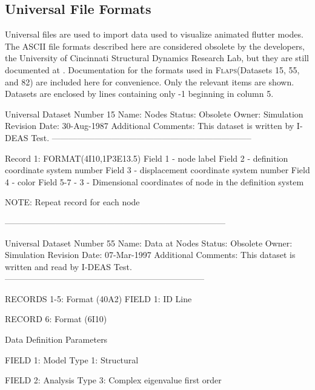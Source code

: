 \documentclass[10pt,openany,twoside]{book}
\numberwithin{equation}{section}   %
\newcommand{\Flaps}{{\normalfont\scshape Flaps\:}}
\begin{document}
\subsection{Universal File Formats}\label{sect:universal-file}
Universal files are used to import data used to visualize animated
flutter modes.
The ASCII file formats described here are considered obsolete by the
developers, the University of Cincinnati Structural Dynamics Research Lab,
but they are still documented at \cite{UniversalFile}. Documentation for
the formats used in \Flaps (Datasets 15, 55, and 82) are included here
for convenience. Only the relevant items are shown. Datasets are enclosed
by lines containing only -1 beginning in column 5.
\par
\begin{example}

Universal Dataset Number 15
Name:   Nodes
Status: Obsolete
Owner:  Simulation
Revision Date: 30-Aug-1987
Additional Comments: This dataset is written by I-DEAS Test.
-----------------------------------------------------------------------

             Record 1: FORMAT(4I10,1P3E13.5)
                       Field 1 -    node label
                       Field 2 -    definition coordinate system number
                       Field 3 -    displacement coordinate system number
                       Field 4 -    color
                       Field 5-7 -  3 - Dimensional coordinates of node
                                    in the definition system

             NOTE:  Repeat record for each node

------------------------------------------------------------------------------

Universal Dataset Number 55
Name:   Data at Nodes
Status: Obsolete
Owner:  Simulation
Revision Date: 07-Mar-1997
Additional Comments: This dataset is written and read by I-DEAS Test.
-----------------------------------------------------------------------

          RECORDS 1-5:      Format (40A2)
               FIELD 1:          ID Line

          RECORD 6:      Format (6I10)

          Data Definition Parameters

               FIELD 1: Model Type
                           1:   Structural

               FIELD 2:  Analysis Type
                           3:   Complex eigenvalue first order


\end{example}
\end{document}
